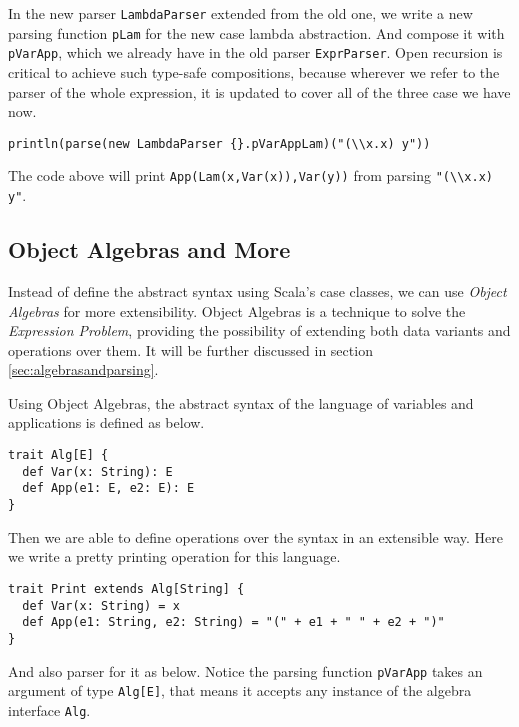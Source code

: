 In the new parser \lstinline{LambdaParser} extended from the old one, we write a new parsing function \lstinline{pLam} for the new case lambda abstraction. And compose it with \lstinline{pVarApp}, which we already have in the old parser \lstinline{ExprParser}. Open recursion is critical to achieve such type-safe compositions, because wherever we refer to the parser of the whole expression, it is updated to cover all of the three case we have now.

\begin{lstlisting}
println(parse(new LambdaParser {}.pVarAppLam)("(\\x.x) y"))
\end{lstlisting}

The code above will print \lstinline{App(Lam(x,Var(x)),Var(y))} from parsing \lstinline{"(\\x.x)} \lstinline{y"}.

\subsection{Object Algebras and More}\label{subsec:overview-oa}

Instead of define the abstract syntax using Scala's case classes, we can use \textit{Object Algebras} for more extensibility. Object Algebras is a technique to solve the \textit{Expression Problem}, providing the possibility of extending both data variants and operations over them. It will be further discussed in section \ref{sec:algebrasandparsing}.

Using Object Algebras, the abstract syntax of the language of variables and applications is defined as below.

\begin{lstlisting}
trait Alg[E] {
  def Var(x: String): E
  def App(e1: E, e2: E): E
}
\end{lstlisting}

Then we are able to define operations over the syntax in an extensible way. Here we write a pretty printing operation for this language.

\begin{lstlisting}
trait Print extends Alg[String] {
  def Var(x: String) = x
  def App(e1: String, e2: String) = "(" + e1 + " " + e2 + ")"
}
\end{lstlisting}

And also parser for it as below. Notice the parsing function \lstinline{pVarApp} takes an argument of type \lstinline{Alg[E]}, that means it accepts any instance of the algebra interface \lstinline{Alg}.

